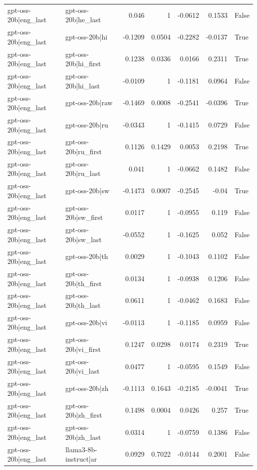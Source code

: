 \begin{table}
\begin{tabular}{l l r r r r l}
gpt-oss-20b|eng_last & gpt-oss-20b|he_last & 0.046 & 1 & -0.0612 & 0.1533 & False \\
gpt-oss-20b|eng_last & gpt-oss-20b|hi & -0.1209 & 0.0504 & -0.2282 & -0.0137 & True \\
gpt-oss-20b|eng_last & gpt-oss-20b|hi_first & 0.1238 & 0.0336 & 0.0166 & 0.2311 & True \\
gpt-oss-20b|eng_last & gpt-oss-20b|hi_last & -0.0109 & 1 & -0.1181 & 0.0964 & False \\
gpt-oss-20b|eng_last & gpt-oss-20b|raw & -0.1469 & 0.0008 & -0.2541 & -0.0396 & True \\
gpt-oss-20b|eng_last & gpt-oss-20b|ru & -0.0343 & 1 & -0.1415 & 0.0729 & False \\
gpt-oss-20b|eng_last & gpt-oss-20b|ru_first & 0.1126 & 0.1429 & 0.0053 & 0.2198 & True \\
gpt-oss-20b|eng_last & gpt-oss-20b|ru_last & 0.041 & 1 & -0.0662 & 0.1482 & False \\
gpt-oss-20b|eng_last & gpt-oss-20b|sw & -0.1473 & 0.0007 & -0.2545 & -0.04 & True \\
gpt-oss-20b|eng_last & gpt-oss-20b|sw_first & 0.0117 & 1 & -0.0955 & 0.119 & False \\
gpt-oss-20b|eng_last & gpt-oss-20b|sw_last & -0.0552 & 1 & -0.1625 & 0.052 & False \\
gpt-oss-20b|eng_last & gpt-oss-20b|th & 0.0029 & 1 & -0.1043 & 0.1102 & False \\
gpt-oss-20b|eng_last & gpt-oss-20b|th_first & 0.0134 & 1 & -0.0938 & 0.1206 & False \\
gpt-oss-20b|eng_last & gpt-oss-20b|th_last & 0.0611 & 1 & -0.0462 & 0.1683 & False \\
gpt-oss-20b|eng_last & gpt-oss-20b|vi & -0.0113 & 1 & -0.1185 & 0.0959 & False \\
gpt-oss-20b|eng_last & gpt-oss-20b|vi_first & 0.1247 & 0.0298 & 0.0174 & 0.2319 & True \\
gpt-oss-20b|eng_last & gpt-oss-20b|vi_last & 0.0477 & 1 & -0.0595 & 0.1549 & False \\
gpt-oss-20b|eng_last & gpt-oss-20b|zh & -0.1113 & 0.1643 & -0.2185 & -0.0041 & True \\
gpt-oss-20b|eng_last & gpt-oss-20b|zh_first & 0.1498 & 0.0004 & 0.0426 & 0.257 & True \\
gpt-oss-20b|eng_last & gpt-oss-20b|zh_last & 0.0314 & 1 & -0.0759 & 0.1386 & False \\
gpt-oss-20b|eng_last & llama3-8b-instruct|ar & 0.0929 & 0.7022 & -0.0144 & 0.2001 & False \\

\end{tabular}
\end{table}
